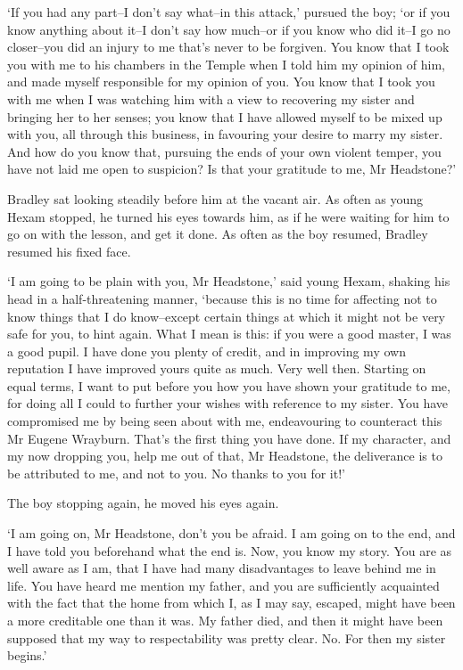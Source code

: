 ‘If you had any part--I don’t say what--in this attack,’ pursued the
boy; ‘or if you know anything about it--I don’t say how much--or if you
know who did it--I go no closer--you did an injury to me that’s never
to be forgiven. You know that I took you with me to his chambers in the
Temple when I told him my opinion of him, and made myself responsible
for my opinion of you. You know that I took you with me when I was
watching him with a view to recovering my sister and bringing her to her
senses; you know that I have allowed myself to be mixed up with you, all
through this business, in favouring your desire to marry my sister. And
how do you know that, pursuing the ends of your own violent temper, you
have not laid me open to suspicion? Is that your gratitude to me, Mr
Headstone?’

Bradley sat looking steadily before him at the vacant air. As often
as young Hexam stopped, he turned his eyes towards him, as if he were
waiting for him to go on with the lesson, and get it done. As often as
the boy resumed, Bradley resumed his fixed face.

‘I am going to be plain with you, Mr Headstone,’ said young Hexam,
shaking his head in a half-threatening manner, ‘because this is no time
for affecting not to know things that I do know--except certain things
at which it might not be very safe for you, to hint again. What I mean
is this: if you were a good master, I was a good pupil. I have done you
plenty of credit, and in improving my own reputation I have improved
yours quite as much. Very well then. Starting on equal terms, I want to
put before you how you have shown your gratitude to me, for doing all
I could to further your wishes with reference to my sister. You have
compromised me by being seen about with me, endeavouring to counteract
this Mr Eugene Wrayburn. That’s the first thing you have done. If my
character, and my now dropping you, help me out of that, Mr Headstone,
the deliverance is to be attributed to me, and not to you. No thanks to
you for it!’

The boy stopping again, he moved his eyes again.

‘I am going on, Mr Headstone, don’t you be afraid. I am going on to the
end, and I have told you beforehand what the end is. Now, you know my
story. You are as well aware as I am, that I have had many disadvantages
to leave behind me in life. You have heard me mention my father, and you
are sufficiently acquainted with the fact that the home from which I, as
I may say, escaped, might have been a more creditable one than it was.
My father died, and then it might have been supposed that my way to
respectability was pretty clear. No. For then my sister begins.’


